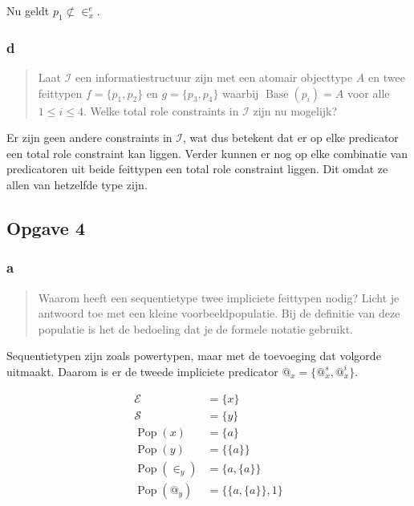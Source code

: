 \documentclass[10pt]{article}
\newcommand{\Base}{\ensuremath{\operatorname{Base}}}
\newcommand{\Pop}{\ensuremath{\operatorname{Pop}}}
\newcommand{\I}{\ensuremath{\mathcal{I}}}
\newcommand{\E}{\ensuremath{\mathcal{E}}}
\renewcommand{\S}{\ensuremath{\mathcal{S}}}
\begin{document}
Nu geldt $p_1 \not\subset \in^e_x$.


\subsubsection{d}

\begin{quote}

  Laat $\I$ een informatiestructuur zijn met een atomair objecttype $A$ en twee
  feittypen $f = \{p_1, p_2\}$ en $g = \{p_3, p_4\}$ waarbij $\Base(p_i) = A$
  voor alle $1 \leq i \leq 4$. Welke total role constraints in $\I$ zijn nu
  mogelijk? \cite{tentamen2011}

\end{quote}

Er zijn geen andere constraints in $\I$, wat dus betekent dat er op elke
predicator een total role constraint kan liggen. Verder kunnen er nog op elke
combinatie van predicatoren uit beide feittypen een total role constraint
liggen. Dit omdat ze allen van hetzelfde type zijn.

\subsection{Opgave 4}

\subsubsection{a}

\begin{quote}
  
  Waarom heeft een sequentietype twee impliciete feittypen nodig? Licht je
  antwoord toe met een kleine voorbeeldpopulatie. Bij de definitie van deze
  populatie is het de bedoeling dat je de formele notatie gebruikt.
  \cite{tentamen2011}

\end{quote}

Sequentietypen zijn zoals powertypen, maar met de toevoeging dat volgorde
uitmaakt. Daarom is er de tweede impliciete predicator $@_x = \{@^s_x,
@^i_x\}$.

\begin{align*}
  \E          & = \{x\}               \\ 
  \S          & = \{y\}               \\ 
  \Pop(x)     & = \{a\}               \\ 
  \Pop(y)     & = \{ \{a\} \}         \\ 
  \Pop(\in_y) & = \{ a, \{a\}\}       \\ 
  \Pop(@_y)   & = \{\{a, \{a\}\}, 1\} \\ 
\end{align*}
\end{document}
